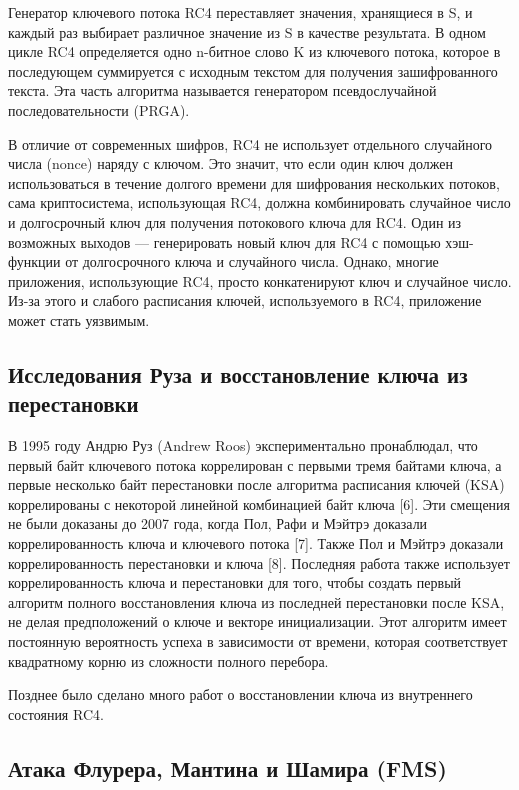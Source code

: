 Генератор ключевого потока RC4 переставляет значения, хранящиеся в S, и каждый
раз выбирает различное значение из S в качестве результата. В одном цикле RC4
определяется одно n-битное слово K из ключевого потока, которое в последующем
суммируется с исходным текстом для получения зашифрованного текста. Эта часть
алгоритма называется генератором псевдослучайной последовательности (PRGA).

В отличие от современных шифров, RC4 не использует отдельного случайного числа
(nonce) наряду с ключом. Это значит, что если один ключ должен использоваться в
течение долгого времени для шифрования нескольких потоков, сама криптосистема,
использующая RC4, должна комбинировать случайное число и долгосрочный ключ для
получения потокового ключа для RC4. Один из возможных выходов --- генерировать
новый ключ для RC4 с помощью хэш-функции от долгосрочного ключа и случайного
числа.  Однако, многие приложения, использующие RC4, просто конкатенируют ключ и
случайное число.  Из-за этого и слабого расписания ключей, используемого в RC4,
приложение может стать уязвимым.

\subsection{Исследования Руза и восстановление ключа из перестановки}

В 1995 году Андрю Руз (Andrew Roos) экспериментально пронаблюдал, что первый
байт ключевого потока коррелирован с первыми тремя байтами ключа, а первые
несколько байт перестановки после алгоритма расписания ключей (KSA)
коррелированы с некоторой линейной комбинацией байт ключа [6]. Эти смещения не
были доказаны до 2007 года, когда Пол, Рафи и Мэйтрэ доказали коррелированность
ключа и ключевого потока [7]. Также Пол и Мэйтрэ доказали коррелированность
перестановки и ключа [8]. Последняя работа также использует коррелированность
ключа и перестановки для того, чтобы создать первый алгоритм полного
восстановления ключа из последней перестановки после KSA, не делая предположений
о ключе и векторе инициализации. Этот алгоритм имеет постоянную вероятность
успеха в зависимости от времени, которая соответствует квадратному корню из
сложности полного перебора.

Позднее было сделано много работ о восстановлении ключа из внутреннего состояния RC4.

\subsection{Атака Флурера, Мантина и Шамира (FMS)}

